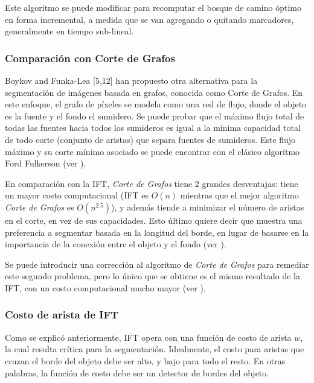 \documentclass[a4paper,10pt]{article}
\begin{document}
Este algoritmo se puede modificar para recomputar el bosque de camino óptimo
en forma incremental, a medida que se van agregando o quitando marcadores,
generalmente en tiempo sub-lineal.

\subsubsection{Comparación con Corte de Grafos}

Boykov and Funka-Lea [5,12] han propuesto otra alternativa para la segmentación
de imágenes basada en grafos, conocida como Corte de Grafos.
En este enfoque, el grafo de píxeles se modela como una red de flujo,
donde el objeto es la fuente y el fondo el sumidero. Se puede probar que el máximo flujo total de todas las fuentes
hacia todos los sumideros es igual a la mínima capacidad total de todo corte
(conjunto de aristas) que separa fuentes de sumideros. Este flujo máximo y su
corte mínimo asociado se puede encontrar con el clásico algoritmo
Ford Fulkerson (ver \cite{Cormen:2009:IAT:1614191}).

En comparación con la IFT, \textit{Corte de Grafos} tiene 2 grandes desventajas:
tiene un mayor costo computacional (IFT es $O(n)$ mientras que
el mejor algoritmo \textit{Corte de Grafos} es $O(n^{2.5})$), y además tiende a
minimizar el número de aristas en el corte, en vez de sus capacidades. Esto
último quiere decir que muestra una preferencia a segmentar basada en la
longitud del borde, en lugar de basarse en la importancia de la conexión
entre el objeto y el fondo (ver \cite{journals/jmiv/MirandaF09}).

Se puede introducir una corrección al algoritmo de \textit{Corte de Grafos} para
remediar este segundo problema, pero lo único que se obtiene es el mismo
resultado de la IFT, con un costo computacional mucho mayor (ver \cite{journals/jmiv/MirandaF09}).

\subsubsection{Costo de arista de IFT}

Como se explicó anteriormente, IFT opera con una función de costo de arista
$w$, la cual resulta crítica para la segmentación. Idealmente, el costo
para aristas que cruzan el borde del objeto debe ser alto, y bajo para todo
el resto. En otras palabras, la función de costo debe ser un detector
de bordes del objeto.
\end{document}
